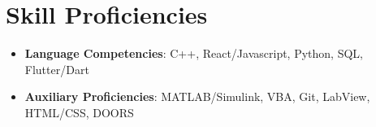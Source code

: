 \documentclass[12pt]{article}
\newcommand\firstboxx[2]{\textbf{\fontsize{12.8}{15}\selectfont #1}, \textit{#2}}
\newcommand{\itemheader}[3]{\firstboxx{#1}{#2}\hfill#3}
\begin{document}



\section*{Skill Proficiencies}
\vspace*{-1em}\makebox[\linewidth]{\rule{\textwidth}{0.4pt}}
\begin{itemize}
\item \textbf{Language Competencies}: C++, React/Javascript, Python, SQL, Flutter/Dart
\item \textbf{Auxiliary Proficiencies}: MATLAB/Simulink, VBA, Git, LabView, HTML/CSS, DOORS
\end{itemize}
\end{document}
